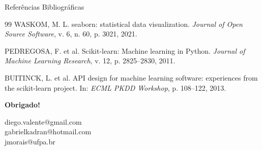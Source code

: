 \documentclass[aspectratio=169]{beamer}
\begin{document}
\begin{frame}[allowframebreaks]{Referências Bibliográficas}
\begin{thebibliography}{99}
    WASKOM, M. L.
    \newblock seaborn: statistical data visualization.
    \newblock \emph{Journal of Open Source Software}, v. 6, n. 60, p. 3021, 2021.

    PEDREGOSA, F. et al.
    \newblock Scikit-learn: Machine learning in Python.
    \newblock \emph{Journal of Machine Learning Research}, v. 12, p. 2825–2830, 2011.

    BUITINCK, L. et al.
    \newblock API design for machine learning software: experiences from the scikit-learn project.
    \newblock In: \emph{ECML PKDD Workshop}, p. 108–122, 2013.

    \end{thebibliography}
\end{frame}



\begin{frame}
    \centering
    \Huge \textbf{Obrigado!}
    
    \vspace{0.59cm}
    
    
    \vspace{1cm}
    
    \normalsize
    diego.valente@gmail.com\\
    gabrielkadran@hotmail.com\\
    jmorais@ufpa.br
\end{frame}
\end{document}
